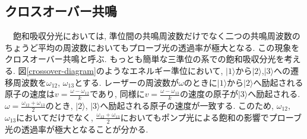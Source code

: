 \documentclass[uplatex, dvipdfmx, a4paper, report, papersize, 11pt]{jsbook}
\begin{document}
\subsection{クロスオーバー共鳴}
　飽和吸収分光においては, 準位間の共鳴周波数だけでなく二つの共鳴周波数のちょうど平均の周波数においてもプローブ光の透過率が極大となる. この現象をクロスオーバー共鳴と呼ぶ. もっとも簡単な三準位の系での飽和吸収分光を考える. 図\ref{crossover-diagram}のようなエネルギー準位において, $|1\rangle$から$|2\rangle$,$|3\rangle$への遷移周波数を$\omega_{12}$, $\omega_{13}$とする. レーザーの周波数が$\omega$のときに$|1\rangle$から$|2\rangle$へ励起される原子の速度は$v = \frac{\omega - \omega_{12}}{k}$であり, 同様に$v = \frac{\omega - \omega_{13}}{k}$の速度の原子が$|3\rangle$へ励起される.
$\omega = \frac{\omega_{12} + \omega_{13}}{2}$のとき, $|2\rangle$, $|3\rangle$へ励起される原子の速度が一致する. このため, $\omega_12$, $\omega_13$においてだけでなく, $\frac{\omega_{12} + \omega_{13}}{2}$においてもポンプ光による飽和の影響でプローブ光の透過率が極大となることが分かる.
\end{document}
